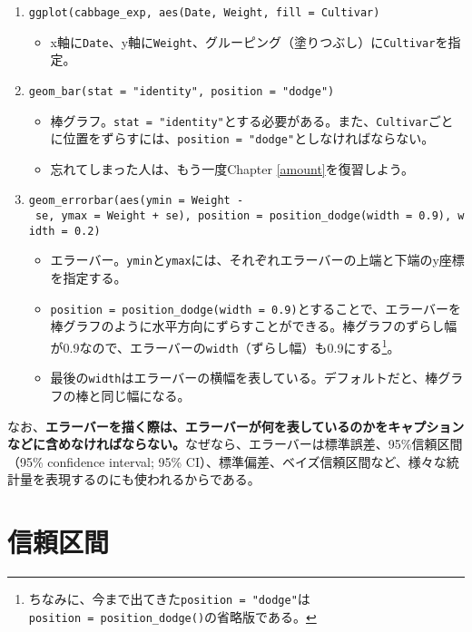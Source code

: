 \documentclass[]{book}
\providecommand{\tightlist}{%
  \setlength{\itemsep}{0pt}\setlength{\parskip}{0pt}}
\let\rmarkdownfootnote\footnote%
\def\footnote{\protect\rmarkdownfootnote}
\begin{document}
\begin{enumerate}
\def\labelenumi{\arabic{enumi}.}
\setcounter{enumi}{-1}
\item
  \texttt{ggplot(cabbage\_exp,\ aes(Date,\ Weight,\ fill\ =\ Cultivar)}

  \begin{itemize}
  \tightlist
  \item
    x軸に\texttt{Date}、y軸に\texttt{Weight}、グルーピング（塗りつぶし）に\texttt{Cultivar}を指定。
  \end{itemize}
\item
  \texttt{geom\_bar(stat\ =\ "identity",\ position\ =\ "dodge")}

  \begin{itemize}
  \item
    棒グラフ。\texttt{stat\ =\ "identity"}とする必要がある。また、\texttt{Cultivar}ごとに位置をずらすには、\texttt{position\ =\ "dodge"}としなければならない。
  \item
    忘れてしまった人は、もう一度Chapter \ref{amount}を復習しよう。
  \end{itemize}
\item
  \texttt{geom\_errorbar(aes(ymin\ =\ Weight\ -\ se,\ ymax\ =\ Weight\ +\ se),\ position\ =\ position\_dodge(width\ =\ 0.9),\ width\ =\ 0.2)}

  \begin{itemize}
  \item
    エラーバー。\texttt{ymin}と\texttt{ymax}には、それぞれエラーバーの上端と下端のy座標を指定する。
  \item
    \texttt{position\ =\ position\_dodge(width\ =\ 0.9)}とすることで、エラーバーを棒グラフのように水平方向にずらすことができる。棒グラフのずらし幅が0.9なので、エラーバーの\texttt{width}（ずらし幅）も0.9にする\footnote{ちなみに、今まで出てきた\texttt{position\ =\ "dodge"}は\texttt{position\ =\ position\_dodge()}の省略版である。}。
  \item
    最後の\texttt{width}はエラーバーの横幅を表している。デフォルトだと、棒グラフの棒と同じ幅になる。
  \end{itemize}
\end{enumerate}

なお、\textbf{エラーバーを描く際は、エラーバーが何を表しているのかをキャプションなどに含めなければならない。}なぜなら、エラーバーは標準誤差、95\%信頼区間（95\%
confidence interval; 95\%
CI）、標準偏差、ベイズ信頼区間など、様々な統計量を表現するのにも使われるからである。

\section{信頼区間}
\end{document}
